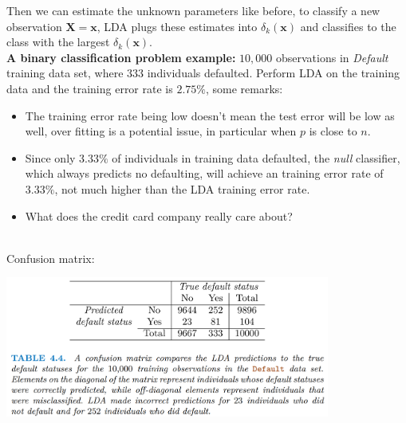 \documentclass[11pt]{article}
\begin{document}
\noindent Then we can estimate the unknown parameters like before, to classify a new observation $\boldsymbol{X} = \boldsymbol{x}$, LDA plugs these estimates into $\delta_k(\boldsymbol{x})$ and classifies to the class with the largest $\delta_k(\boldsymbol{x})$. \\

\noindent \textbf{A binary classification problem example:} $10,000$ observations in \textit{Default} training data set, where $333$ individuals defaulted. Perform LDA on the training data and the training error rate is $2.75\%$, some remarks:
\begin{itemize}
    \item The training error rate being low doesn't mean the test error will be low as well, over fitting is a potential issue, in particular when $p$ is close to $n$.
    \item Since only $3.33\%$ of individuals in training data defaulted, the \textit{null} classifier, which always predicts no defaulting, will achieve an training error rate of $3.33\%$, not much higher than the LDA training error rate.
    \item  What does the credit card company really care about?
\end{itemize}
\phantom{i} \\
\noindent Confusion matrix:
\begin{center}
  \includegraphics[width=0.8\textwidth]{LDA Example Confusion Matrix.png}
\end{center}
\end{document}

